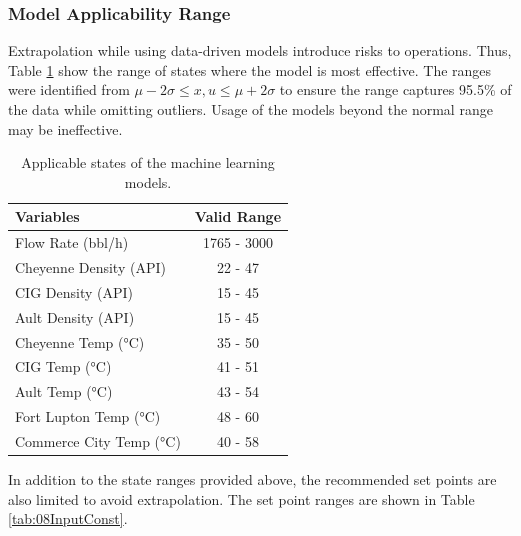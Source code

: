 \subsubsection{Model Applicability Range}
Extrapolation while using data-driven models introduce risks to operations. Thus, Table \ref{tab:08StateConst} show the range of states where the model is most effective. The ranges were identified from $\mu - 2\sigma \leq x, u \leq \mu + 2\sigma$ to ensure the range captures 95.5\% of the data while omitting outliers. Usage of the models beyond the normal range may be ineffective.

\begin{table}[h]
    \centering
    {
    \begin{tabular}{ p{5cm} | c }
        Variables                         &  Valid Range           \\
        \hline
        Flow Rate (bbl/h)                       &      1765 - 3000       \\
        Cheyenne Density (API)                  &      22 - 47           \\ 
        CIG Density (API)                       &      15 - 45           \\
        Ault Density (API)                      &      15 - 45           \\
        Cheyenne Temp (°C)                      &      35 - 50           \\
        CIG Temp (°C)                           &      41 - 51           \\
        Ault Temp (°C)                          &      43 - 54           \\
        Fort Lupton Temp (°C)                   &      48 - 60           \\
        Commerce City Temp  (°C)                &      40 - 58           \\
    \end{tabular}}
    \caption{Applicable states of the machine learning models.}
    \label{tab:08StateConst}
\end{table}

In addition to the state ranges provided above, the recommended set points are also limited to avoid extrapolation.  The set point ranges are shown in Table \ref{tab:08InputConst}.

